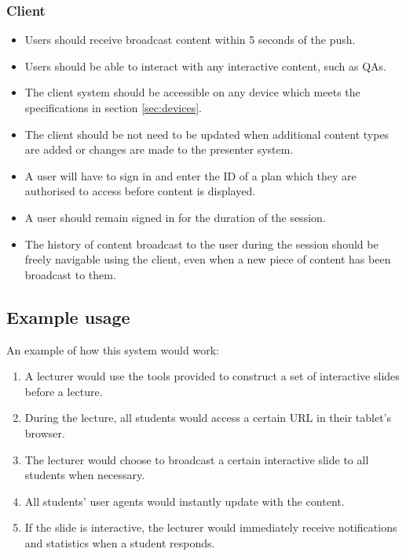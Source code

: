 \documentclass[a4papert,11pt,notitlepage]{ltxdoc}
\begin{document}
\subsubsection{Client}
\begin{itemize}
\item Users should receive broadcast content within 5 seconds of the push.
\item Users should be able to interact with any interactive content, such as QAs.
\item The client system should be accessible on any device which meets the specifications in section \ref{sec:devices}.
\item The client should be not need to be updated when additional content types are added or changes are made to the presenter system.
\item A user will have to sign in and enter the ID of a plan which they are authorised to access before content is displayed.
\item A user should remain signed in for the duration of the session.
\item The history of content broadcast to the user during the session should be freely navigable using the client, even when a new piece of content has been broadcast to them.
\end{itemize}

\subsection{Example usage}
An example of how this system would work:
\begin{enumerate}
\item A lecturer would use the tools provided to construct a set of interactive slides before a lecture.
\item During the lecture, all students would access a certain URL in their tablet's browser.
\item The lecturer would choose to broadcast a certain interactive slide to all students when necessary.
\item All students' user agents would instantly update with the content.
\item If the slide is interactive, the lecturer would immediately receive notifications and statistics when a student responds.
\end{enumerate}
\end{document}
